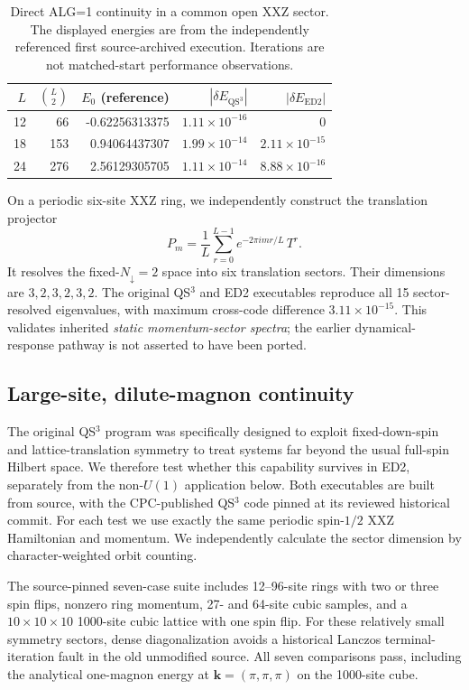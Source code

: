 \documentclass[preprint,12pt,nopreprintline]{elsarticle}
\newcommand{\QSthree}{QS$^{3}$}
\newcommand{\updn}{N_{\downarrow}}
\begin{document}
\begin{table}[t]
\centering
\caption{Direct ALG=1 continuity in a common open XXZ sector.
The displayed energies are from the independently referenced
first source-archived execution. Iterations are not matched-start
performance observations.}
\label{tab:continuity}
{\small
\begin{tabular}{rrrrr}
\toprule
$L$ & $\binom{L}{2}$ & $E_0$ (reference)
& $|\delta E_{\mathrm{QS^3}}|$ & $|\delta E_{\mathrm{ED2}}|$\\
\midrule
12 & 66 & -0.62256313375 & $1.11\times10^{-16}$ & 0\\
18 & 153 & 0.94064437307 & $1.99\times10^{-14}$ & $2.11\times10^{-15}$\\
24 & 276 & 2.56129305705 & $1.11\times10^{-14}$ & $8.88\times10^{-16}$\\
\bottomrule
\end{tabular}
}
\end{table}

On a periodic six-site XXZ ring, we independently construct
the translation projector
\begin{equation}
P_m=\frac{1}{L}\sum_{r=0}^{L-1}e^{-2\pi i m r/L}\,T^r.
\end{equation}
It resolves the fixed-$\updn=2$ space into six translation
sectors. Their dimensions are $3,2,3,2,3,2$.
The original \QSthree{} and ED2 executables reproduce
all 15 sector-resolved eigenvalues, with maximum
cross-code difference $3.11\times10^{-15}$.
This validates inherited \emph{static momentum-sector
spectra}; the earlier dynamical-response pathway is not
asserted to have been ported.


\subsection{Large-site, dilute-magnon continuity}
The original QS$^3$ program was specifically designed to
exploit fixed-down-spin and lattice-translation symmetry
to treat systems far beyond the usual full-spin Hilbert
space. We therefore test whether this capability survives
in ED2, separately from the non-$U(1)$ application below.
Both executables are built from source, with the CPC-published
QS$^3$ code pinned at its reviewed historical commit.
For each test we use exactly the same periodic spin-$1/2$
XXZ Hamiltonian and momentum. We independently calculate
the sector dimension by character-weighted orbit counting.

The source-pinned seven-case suite includes 12--96-site
rings with two or three spin flips, nonzero ring momentum,
27- and 64-site cubic samples, and a $10\times10\times10$
1000-site cubic lattice with one spin flip. For these
relatively small symmetry sectors, dense diagonalization
avoids a historical Lanczos terminal-iteration fault in
the old unmodified source. All seven comparisons pass,
including the analytical one-magnon energy at
$\bm k=(\pi,\pi,\pi)$ on the 1000-site cube.
\end{document}
